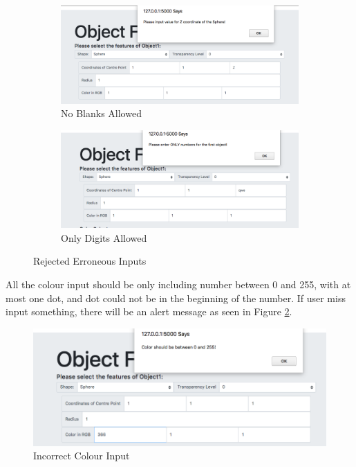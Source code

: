 \documentclass[a4paper, 12pt]{article}
\begin{document}
\begin{figure}[h!]
  \centering
  \begin{subfigure}[b]{1\linewidth}
    \includegraphics[width=\linewidth]{GUI_Figure4a.png}
    \caption{No Blanks Allowed}
  \end{subfigure}
  \begin{subfigure}[b]{1\linewidth}
    \includegraphics[width=\linewidth]{GUI_Figure4b.png}
    \caption{Only Digits Allowed}
  \end{subfigure}
  \caption{Rejected Erroneous Inputs}
  \label{fig:GUI_Figure4}
\end{figure}

All the colour input should be only including number between 0 and 255, with at most one dot, and dot could not be in the beginning of the number. If user miss input something, there will be an alert message as seen in Figure \ref{fig:GUI_Figure5}.


\begin{figure}[!htb]
\centering
\includegraphics[scale=0.5]{GUI_Figure5.png}
\caption{Incorrect Colour Input}
\label{fig:GUI_Figure5}
\end{figure}
\end{document}
